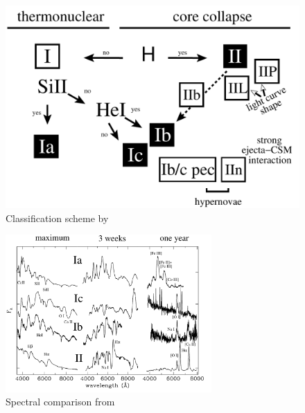 \begin{figure}[htb] %
   \centering
   \includegraphics[width=.7\textwidth]{chapter_intro/plots/sn_classification.pdf} 
   \caption{Classification scheme by \citet{2003LNP...598...21T}}
   \label{fig:sn_classification}
\end{figure}

\begin{figure}[htb] %
   \centering
   \includegraphics[width=0.7\textwidth]{chapter_intro/plots/sn_class_spectra.pdf} 
   \caption{Spectral comparison from \citet{2003LNP...598...21T}}
   \label{fig:sn_class_spectra}
\end{figure}


